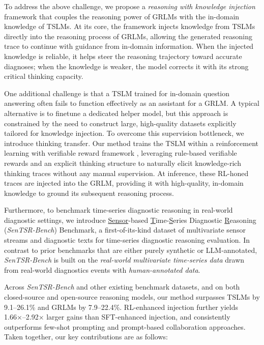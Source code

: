 \documentclass[twoside]{article}
\begin{document}
To address the above challenge, we propose a \emph{reasoning with knowledge injection} framework that couples the reasoning power of GRLMs with the in-domain knowledge of TSLMs. At its core, the framework injects knowledge from TSLMs directly into the reasoning process of GRLMs, allowing the generated reasoning trace to continue with guidance from in-domain information. When the injected knowledge is reliable, it helps steer the reasoning trajectory toward accurate diagnoses; when the knowledge is weaker, the model corrects it with its strong critical thinking capacity. 

One additional challenge is that a TSLM trained for in-domain question answering often fails to function effectively as an assistant for a GRLM. A typical alternative is to finetune a dedicated helper model, but this approach is constrained by the need to construct large, high-quality datasets explicitly tailored for knowledge injection. To overcome this supervision bottleneck, we introduce thinking transfer. Our method trains the TSLM within a  reinforcement learning with verifiable reward framework \citep{guo2025deepseek}, leveraging rule-based verifiable rewards and an explicit thinking structure to naturally elicit knowledge-rich thinking traces without any manual supervision. At inference, these RL-honed traces are injected into the GRLM, providing it with high-quality, in-domain knowledge to ground its subsequent reasoning process. 

Furthermore, to benchmark time‐series diagnostic reasoning in real-world diagnostic settings, we introduce \underline{Sensor}-based \underline{T}ime-\underline{S}eries Diagnostic \underline{R}easoning (\emph{SenTSR-Bench}) Benchmark, a first-of-its-kind dataset of multivariate sensor streams and diagnostic texts for time-series diagnostic reasoning evaluation. In contrast to prior benchmarks that are either purely synthetic or LLM-annotated, \emph{SenTSR-Bench} is built on the \textit{real-world multivariate time-series data} drawn from real-world diagnostics events with \textit{human-annotated data}.

Across \textit{SenTSR-Bench} and other existing benchmark datasets, and on both closed-source and open-source reasoning models, our method surpasses TSLMs by 9.1–26.1\% and GRLMs by 7.9–22.4\%. RL-enhanced injection further yields 1.66×–2.92× larger gains than SFT-enhanced injection, and consistently outperforms few-shot prompting and prompt-based collaboration approaches. Taken together, our key contributions are as follows:
\end{document}
